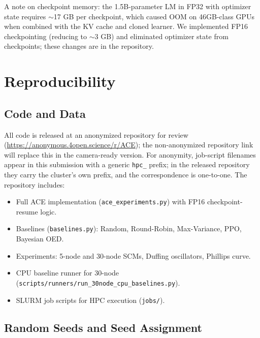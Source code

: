 \documentclass[twoside]{article}
\theoremstyle{plain}
\theoremstyle{definition}
\theoremstyle{remark}
\begin{document}
A note on checkpoint memory: the 1.5B-parameter LM in FP32 with optimizer state requires $\sim$17 GB per checkpoint, which caused OOM on 46GB-class GPUs when combined with the KV cache and cloned learner. We implemented FP16 checkpointing (reducing to $\sim$3 GB) and eliminated optimizer state from checkpoints; these changes are in the repository.

\section{Reproducibility}
\label{app:reproducibility}

\subsection{Code and Data}

All code is released at an anonymized repository for review (\url{https://anonymous.4open.science/r/ACE}); the non-anonymized repository link will replace this in the camera-ready version. For anonymity, job-script filenames appear in this submission with a generic \texttt{hpc\_} prefix; in the released repository they carry the cluster's own prefix, and the correspondence is one-to-one. The repository includes:
\begin{itemize}[leftmargin=1.2em,topsep=0.2em,itemsep=0.1em]
\item Full ACE implementation (\texttt{ace\_experiments.py}) with FP16 checkpoint-resume logic.
\item Baselines (\texttt{baselines.py}): Random, Round-Robin, Max-Variance, PPO, Bayesian OED.
\item Experiments: 5-node and 30-node SCMs, Duffing oscillators, Phillips curve.
\item CPU baseline runner for 30-node (\texttt{scripts/runners/run\_30node\_cpu\_baselines.py}).
\item SLURM job scripts for HPC execution (\texttt{jobs/}).
\end{itemize}

\subsection{Random Seeds and Seed Assignment}
\end{document}
